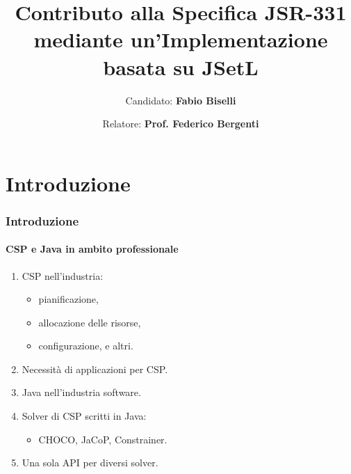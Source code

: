 \documentclass{beamer}
\author[F.Biselli]{Candidato: \textbf{Fabio Biselli}\\
\and Relatore: \textbf{Prof. Federico Bergenti}}
\institute[D.d.L. Informatica]{Università degli Studi di Parma}
\title[Contributo alla Specifica JSR-331]{Contributo alla Specifica JSR-331 mediante un'Implementazione
basata su JSetL}
\date[18 Aprile 2012]{}
\begin{document}
\begin{frame}
\maketitle
\end{frame}


\section{Introduzione}
\begin{frame}
\frametitle{Introduzione}
\framesubtitle{CSP e Java in ambito professionale}
\begin{enumerate}[<+->]
\item CSP nell'industria:
  \begin{itemize}[<+->]
  \item pianificazione,
  \item allocazione delle risorse,
  \item configurazione, e altri.
  \end{itemize}
\item Necessità di applicazioni per CSP.
\item Java nell'industria software.
\item Solver di CSP scritti in Java:
  \begin{itemize}[<+->]
  \item CHOCO, JaCoP, Constrainer.
  \end{itemize}
\item Una sola API per diversi solver.
\end{enumerate}
\end{frame}
\end{document}

